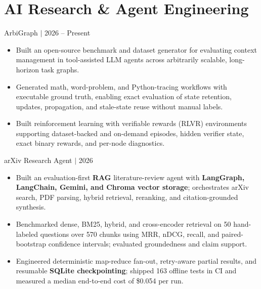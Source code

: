\documentclass[9pt, letterpaper]{extarticle}
\newcommand{\resumeItem}[1]{\item\small{#1}}
\begin{document}
\section{AI Research \& Agent Engineering}
\begin{itemize}[leftmargin=0.15pt]

\resumeSubheading
    {ArbiGraph $\vert$ }{2026 -- Present}
    \begin{itemize}[leftmargin=0.15in, topsep=2pt]
        \resumeItem{Built an open-source benchmark and dataset generator for evaluating context management in tool-assisted LLM agents across arbitrarily scalable, long-horizon task graphs.}
        \resumeItem{Generated math, word-problem, and Python-tracing workflows with executable ground truth, enabling exact evaluation of state retention, updates, propagation, and stale-state reuse without manual labels.}
        \resumeItem{Built reinforcement learning with verifiable rewards (RLVR) environments supporting dataset-backed and on-demand episodes, hidden verifier state, exact binary rewards, and per-node diagnostics.}
    \end{itemize}

\resumeSubheading
    {arXiv Research Agent $\vert$ }{2026}
    \begin{itemize}[leftmargin=0.15in, topsep=2pt]
        \resumeItem{Built an evaluation-first \textbf{RAG} literature-review agent with \textbf{LangGraph, LangChain, Gemini, and Chroma vector storage}; orchestrates arXiv search, PDF parsing, hybrid retrieval, reranking, and citation-grounded synthesis.}
        \resumeItem{Benchmarked dense, BM25, hybrid, and cross-encoder retrieval on 50 hand-labeled questions over 570 chunks using MRR, nDCG, recall, and paired-bootstrap confidence intervals; evaluated groundedness and claim support.}
        \resumeItem{Engineered deterministic map-reduce fan-out, retry-aware partial results, and resumable \textbf{SQLite checkpointing}; shipped 163 offline tests in CI and measured a median end-to-end cost of \$0.054 per run.}
    \end{itemize}


\end{itemize}
\end{document}
